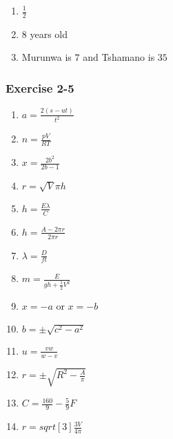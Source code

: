 {\begin{multicols}{3}
\begin{enumerate}[noitemsep, label=\textbf{\arabic*}. ]
\item $\frac{1}{2}$ %
\item $8$ years old %
\item Murunwa is $7$ and Tshamano is $35$ %
\end{enumerate}

\subsubsection*{Exercise 2-5} %

\begin{enumerate}[itemsep=1pt,  label=\textbf{\arabic*}. ] 
\item $a = \frac{2(s - ut)}{t^2}$%
\item $n = \frac{pV}{RT}$%
\item $x = \frac{2b^2}{2b - 1}$%
\item $r = \sqrt{V}{\pi h}$%
\item $h = \frac{E\lambda}{C}$%

\item $h = \frac{A - 2\pi r}{2\pi r}$%
\item $\lambda = \frac{D}{ft}$%
\item $m =\frac{E}{gh + \frac{1}{2}V^2}$%
\item $x=-a$ or $x=-b$ %
\item $b=\pm \sqrt{c^2-a^2}$ %
\item $u=\frac{vw}{w-v}$ %
\item $r=\pm \sqrt{R^2-\frac{A}{\pi}}$ 
\item $C=\frac{160}{9}-\frac{5}{9}F$ %
\item $r=sqrt[3]{\frac{3V}{4 \pi}}$ %
\end{enumerate}



\end{multicols}}
